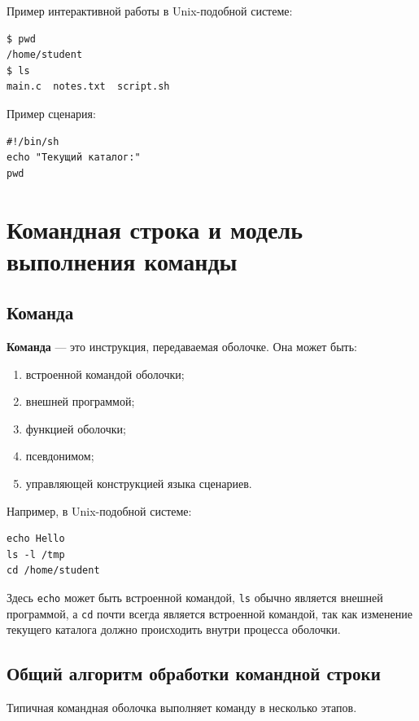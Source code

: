 \documentclass[12pt,a4paper]{article}
\begin{document}
Пример интерактивной работы в Unix-подобной системе:

\begin{lstlisting}
$ pwd
/home/student
$ ls
main.c  notes.txt  script.sh
\end{lstlisting}

Пример сценария:

\begin{lstlisting}
#!/bin/sh
echo "Текущий каталог:"
pwd
\end{lstlisting}

\section{Командная строка и модель выполнения команды}

\subsection{Команда}

\textbf{Команда} --- это инструкция, передаваемая оболочке. Она может быть:
\begin{enumerate}
    \item встроенной командой оболочки;
    \item внешней программой;
    \item функцией оболочки;
    \item псевдонимом;
    \item управляющей конструкцией языка сценариев.
\end{enumerate}

Например, в Unix-подобной системе:

\begin{lstlisting}
echo Hello
ls -l /tmp
cd /home/student
\end{lstlisting}

Здесь \texttt{echo} может быть встроенной командой, \texttt{ls} обычно является внешней программой, а \texttt{cd} почти всегда является встроенной командой, так как изменение текущего каталога должно происходить внутри процесса оболочки.

\subsection{Общий алгоритм обработки командной строки}

Типичная командная оболочка выполняет команду в несколько этапов.
\end{document}
